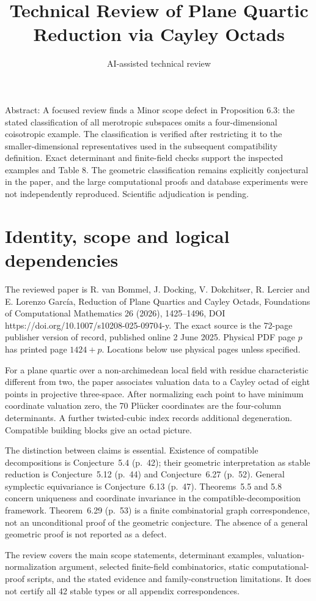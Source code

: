 \documentclass[10pt]{article}
\title{Technical Review of Plane Quartic
Reduction via Cayley Octads}
\author{AI-assisted technical review}
\date{}
\begin{document}
\maketitle
Abstract: A focused review finds a Minor scope defect in Proposition 6.3: the stated classification of all merotropic subspaces omits a four-dimensional coisotropic example. The classification is verified after restricting it to the smaller-dimensional representatives used in the subsequent compatibility definition. Exact determinant and finite-field checks support the inspected examples and Table 8. The geometric classification remains explicitly conjectural in the paper, and the large computational proofs and database experiments were not independently reproduced. Scientific adjudication is pending.\par
\section*{Identity, scope and logical dependencies}
The reviewed paper is R. van Bommel, J. Docking, V. Dokchitser, R. Lercier and E. Lorenzo García, Reduction of Plane Quartics and Cayley Octads, Foundations of Computational Mathematics 26 (2026), 1425–1496, DOI https://doi.org/10.1007/s10208-025-09704-y. The exact source is the 72-page publisher version of record, published online 2 June 2025. Physical PDF page \(p\) has printed page \(1424+p\). Locations below use physical pages unless specified.\par
For a plane quartic over a non-archimedean local field with residue characteristic different from two, the paper associates valuation data to a Cayley octad of eight points in projective three-space. After normalizing each point to have minimum coordinate valuation zero, the 70 Plücker coordinates are the four-column determinants. A further twisted-cubic index records additional degeneration. Compatible building blocks give an octad picture.\par
The distinction between claims is essential. Existence of compatible decompositions is Conjecture 5.4 (p. 42); their geometric interpretation as stable reduction is Conjecture 5.12 (p. 44) and Conjecture 6.27 (p. 52). General symplectic equivariance is Conjecture 6.13 (p. 47). Theorems 5.5 and 5.8 concern uniqueness and coordinate invariance in the compatible-decomposition framework. Theorem 6.29 (p. 53) is a finite combinatorial graph correspondence, not an unconditional proof of the geometric conjecture. The absence of a general geometric proof is not reported as a defect.\par
The review covers the main scope statements, determinant examples, valuation-normalization argument, selected finite-field combinatorics, static computational-proof scripts, and the stated evidence and family-construction limitations. It does not certify all 42 stable types or all appendix correspondences.\par
\end{document}
